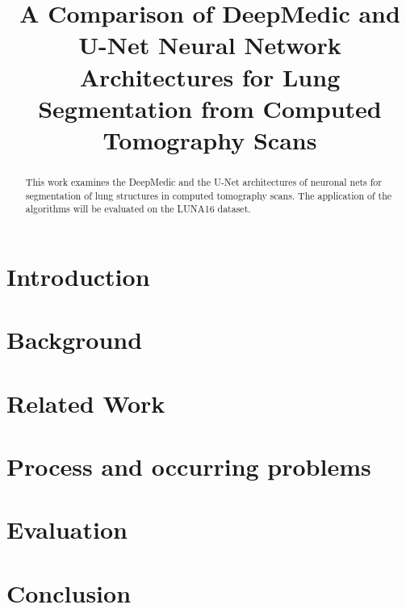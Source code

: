 \documentclass[conference]{IEEEtran}
\begin{document}
\title{A Comparison of DeepMedic and U-Net Neural Network Architectures for Lung Segmentation from Computed Tomography Scans}

\author{
	\and
	\and
	\and
}


\maketitle

\begin{abstract}
This work examines the DeepMedic and the U-Net architectures of neuronal nets for segmentation of lung structures in computed tomography scans. The application of the algorithms will be evaluated on the LUNA16 dataset.
\end{abstract}

\section{Introduction}



\section{Background}


\section{Related Work}


\section{Process and occurring problems}


\section{Evaluation}


\section{Conclusion}




\end{document}
